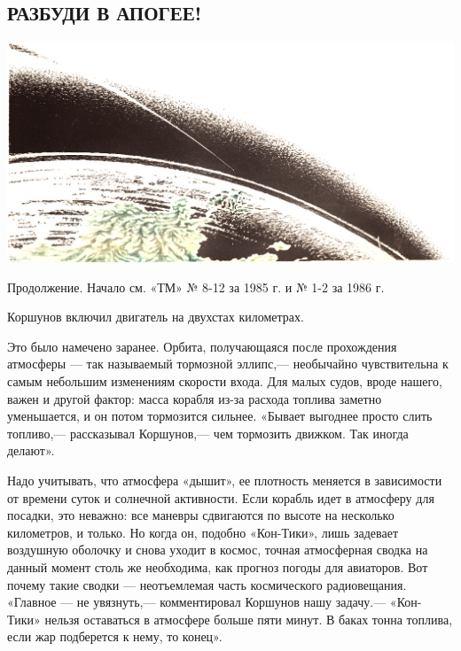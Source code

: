\documentclass[11pt,a4paper,oneside]{article}
\begin{document}
\subsection{РАЗБУДИ В АПОГЕЕ!}
\label{apogee}

\includegraphics[width=\textwidth]{apogee1}

Продолжение. Начало см. «ТМ» № 8-12 за 1985 г. и № 1-2 за 1986 г.

Коршунов включил двигатель на двухстах километрах.

Это было намечено заранее. Орбита, получающаяся после прохождения атмосферы — так называемый тормозной эллипс,— необычайно чувствительна к самым небольшим изменениям скорости входа. Для малых судов, вроде нашего, важен и другой фактор: масса корабля из-за расхода топлива заметно уменьшается, и он потом тормозится сильнее. «Бывает выгоднее просто слить топливо,— рассказывал	Коршунов,— чем тормозить движком. Так иногда делают».

Надо учитывать, что атмосфера «дышит», ее плотность меняется в зависимости от времени суток и солнечной активности. Если корабль идет в атмосферу для посадки, это неважно: все маневры сдвигаются по высоте на несколько километров, и только. Но когда он, подобно «Кон-Тики», лишь задевает воздушную оболочку и снова уходит в космос, точная атмосферная сводка на данный момент столь же необходима, как прогноз погоды для авиаторов. Вот почему такие сводки — неотъемлемая часть космического радиовещания. «Главное — не увязнуть,— комментировал Коршунов нашу задачу.— «Кон-Тики» нельзя оставаться в атмосфере больше пяти минут. В баках тонна топлива, если жар подберется к нему, то конец».
\end{document}
